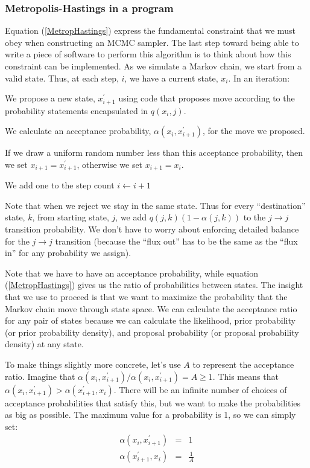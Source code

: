 \documentclass[11pt]{article}
\newcommand{\prop}[2]{q(#1,#2)}
\newcommand{\accept}[2]{\alpha({#1,#2})}
\begin{document}
\subsubsection*{Metropolis-Hastings in a program}
Equation (\ref{MetropHastings}) express the fundamental constraint that we must obey when constructing an MCMC sampler. 
The last step toward being able to write a piece of software to perform this algorithm is to think about how this constraint can be implemented.
As we simulate a Markov chain, we start from a valid state.  Thus, at each step, $i$, we have a current state, $x_i$.
In an iteration:
\begin{compactenum}
	\item We propose a new state, $x_{i+1}^{\prime}$ using code that proposes move according to the probability statements encapsulated in $\prop{x_i}{j}$.
	\item We calculate an acceptance probability, $\accept{x_{i}}{x_{i+1}^{\prime}}$, for the move we proposed.
	\item If we draw a uniform random number less than this acceptance probability, then we set $x_{i+1} = x_{i+1}^{\prime}$, otherwise we set $x_{i+1} = x_{i}$.
	\item We add one to the step count $i \leftarrow i + 1$
\end{compactenum}
Note that when we reject we stay in the same state.
Thus for every ``destination'' state, $k$,  from starting state, $j$, we add $\prop{j}{k}\left(1-\accept{j}{k}\right)$ to the $j\rightarrow j$ transition probability.
We don't have to worry about enforcing detailed balance for the $j\rightarrow j$ transition (because the ``flux out'' has to be the same as the ``flux in'' for any probability we assign).

Note that we have to have an acceptance probability, while equation (\ref{MetropHastings}) gives us the ratio of probabilities between states.
The insight that we use to proceed is that we want to maximize the probability that the Markov chain move through state space.
We can calculate the acceptance ratio for any pair of states because we can calculate the likelihood, prior probability (or prior probability density), and proposal probability (or proposal probability density) at any state.

To make things slightly more concrete, let's use $A$ to represent the acceptance ratio.
Imagine that ${\accept{x_{i}}{x_{i + 1}^{\prime}}}/{\accept{x_{i}}{x_{i + 1}^{\prime}}} = A \geq 1$. 
This means that $\accept{x_{i}}{x_{i + 1}^{\prime}} > \accept{x_{i + 1}^{\prime}}{x_{i}} $.
There will be an infinite number of choices of acceptance probabilities that satisfy this, but we want to make the probabilities as big as possible.
The maximum value for a probability is 1, so we can simply set:
\begin{eqnarray*}
	\accept{x_{i}}{x_{i + 1}^{\prime}} & = &  1 \\
	\accept{x_{i + 1}^{\prime}}{x_{i}}  & = & \frac{1}{A}
\end{eqnarray*}
\end{document}

